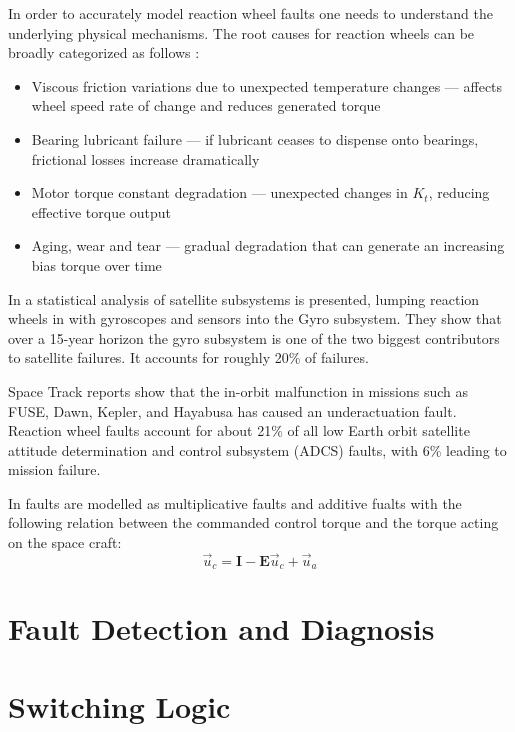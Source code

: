 In order to accurately model reaction wheel faults one needs to understand the underlying physical mechanisms. The root causes for reaction wheels can be broadly categorized as follows \cite{shenActiveFaulttolerantControl2019}:
\begin{itemize}
\item Viscous friction variations due to unexpected temperature changes — affects wheel speed rate of change and reduces generated torque
\item Bearing lubricant failure — if lubricant ceases to dispense onto bearings, frictional losses increase dramatically
\item Motor torque constant degradation — unexpected changes in $K_t$, reducing effective torque output
\item Aging, wear and tear — gradual degradation that can generate an increasing bias torque over time
\end{itemize}

In \cite{castetSatelliteSatelliteSubsystems2009} a statistical analysis of satellite subsystems is presented, lumping reaction wheels in with gyroscopes and sensors into the Gyro subsystem. They show that over a 15-year horizon  the gyro subsystem is one of the two biggest contributors to satellite failures. It accounts for roughly 20\% of failures. 

Space Track reports show that the in-orbit malfunction in missions such as FUSE, Dawn, Kepler, and Hayabusa has caused an underactuation fault. Reaction wheel faults account for about 21\% of all low Earth orbit
satellite attitude determination and control subsystem (ADCS) faults, with 6\% leading to mission failure. \cite{zarouratiUnderactuatedFaultTolerantControl}

In \cite{shenActiveFaulttolerantControl2019} faults are modelled as multiplicative faults and additive fualts with the following relation between the commanded control torque and the torque acting on the space craft:
\begin{equation}
    \vec{u}_c = \mathbf{I} - \mathbf{E}\vec{u}_c + \vec{u}_a
\end{equation}

\section{Fault Detection and Diagnosis}

\section{Switching Logic}

